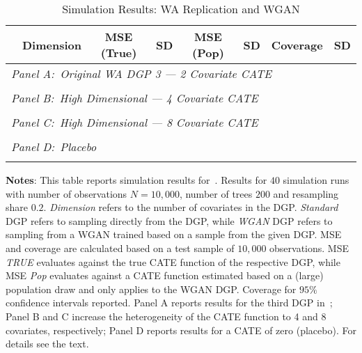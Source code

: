 \documentclass[11pt, a4paper, leqno]{article}
\begin{document}
\begin{table}
    \caption{Simulation Results: WA Replication and WGAN}\label{table:wa_rep_wgan}
    \begin{threeparttable}
        \center
        \begin{tabular}{lccccccc}
            & Dimension & MSE (True) & SD & MSE (Pop) & SD & Coverage & SD \\
            \toprule
            \multicolumn{8}{l}{\textit{Panel A:\ Original WA DGP 3 --- 2 Covariate CATE}} \\
             \\
            \midrule

            \multicolumn{8}{l}{\textit{Panel B:\ High Dimensional --- 4 Covariate CATE}} \\
             \\
            \midrule

            \multicolumn{8}{l}{\textit{Panel C:\ High Dimensional --- 8 Covariate CATE}} \\
             \\
            \midrule

            \multicolumn{8}{l}{\textit{Panel D:\ Placebo}} \\
             \\
            \bottomrule
        \end{tabular}
        \begin{tablenotes}
            \small
            \item \textbf{Notes}: This table reports simulation results for~\cite{wager2018estimation}.
            Results for $40$ simulation runs with number of observations $N=10,000$, number of trees $200$ and resampling share $0.2$.
            \textit{Dimension} refers to the number of covariates in the DGP\@. \textit{Standard} DGP refers to sampling directly from the DGP, while \textit{WGAN} DGP refers to sampling from a WGAN trained based on a sample from the given DGP\@.
            MSE and coverage are calculated based on a test sample of $10,000$ observations. MSE \textit{TRUE} evaluates against the true CATE function of the respective DGP, while MSE \textit{Pop} evaluates against a CATE function estimated based on a (large) population draw and only applies to the WGAN DGP\@.
            Coverage for $95\%$ confidence intervals reported.
            Panel A reports results for the third DGP in~\cite{wager2018estimation}; Panel B and C increase the heterogeneity of the CATE function to 4 and 8 covariates, respectively; Panel D reports results for a CATE of zero (placebo).
            For details see the text.
        \end{tablenotes}
    \end{threeparttable}
\end{table}
\end{document}
